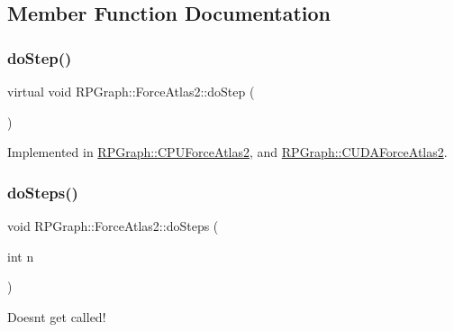 \subsection{Member Function Documentation}
\mbox{\label{classRPGraph_1_1ForceAtlas2_aa448ceec8292797a6e1b61ef8e2b3744}} 
\subsubsection{\texorpdfstring{do\+Step()}{doStep()}}
{\footnotesize\ttfamily virtual void R\+P\+Graph\+::\+Force\+Atlas2\+::do\+Step (\begin{DoxyParamCaption}{ }\end{DoxyParamCaption})\hspace{0.3cm}{\ttfamily [pure virtual]}}



Implemented in \mbox{\hyperlink{classRPGraph_1_1CPUForceAtlas2_a3542ecd2220173aabe4e864fc21826eb}{R\+P\+Graph\+::\+C\+P\+U\+Force\+Atlas2}}, and \mbox{\hyperlink{classRPGraph_1_1CUDAForceAtlas2_a4ebfb858b5c2c19b9e57ef1d434a21a7}{R\+P\+Graph\+::\+C\+U\+D\+A\+Force\+Atlas2}}.

\mbox{\label{classRPGraph_1_1ForceAtlas2_ae02d5fff5d824602da4885187361dfb5}} 
\subsubsection{\texorpdfstring{do\+Steps()}{doSteps()}}
{\footnotesize\ttfamily void R\+P\+Graph\+::\+Force\+Atlas2\+::do\+Steps (\begin{DoxyParamCaption}\item[{int}]{n }\end{DoxyParamCaption})}

Doesn\textquotesingle{}t get called! \mbox{\label{classRPGraph_1_1ForceAtlas2_ab08806505160d4a5ca2b746dd5a0b1c9}} 
